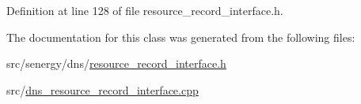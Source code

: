 Definition at line 128 of file resource\-\_\-record\-\_\-interface.\-h.



The documentation for this class was generated from the following files\-:\begin{DoxyCompactItemize}
\item 
src/senergy/dns/\hyperlink{resource__record__interface_8h}{resource\-\_\-record\-\_\-interface.\-h}\item 
src/\hyperlink{dns__resource__record__interface_8cpp}{dns\-\_\-resource\-\_\-record\-\_\-interface.\-cpp}\end{DoxyCompactItemize}
